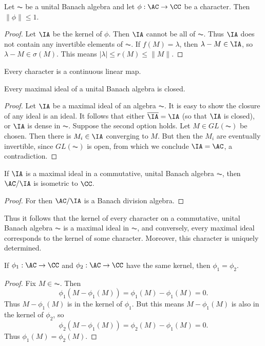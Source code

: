 \begin{lemma}
    Let $\AC$ be a unital Banach algebra and let $\phi: \AC \to \CC$ be a character. Then $\| \phi \| \leq 1$.
\end{lemma}
\begin{proof}
    Let $\IA$ be the kernel of $\phi$. Then $\IA$ cannot be all of $\AC$. Thus $\IA$ does not contain any invertible elements of $\AC$. If $f(M) = \lambda$, then $\lambda - M \in \IA$, so $\lambda - M \in \sigma(M)$. This means $|\lambda| \leq r(M) \leq \| M \|$.
\end{proof}

\begin{corollary}
    Every character is a continuous linear map.
\end{corollary}

\begin{lemma}
    Every maximal ideal of a unital Banach algebra is closed.
\end{lemma}
\begin{proof}
    Let $\IA$ be a maximal ideal of an algebra $\AC$. It is easy to show the closure of any ideal is an ideal. It follows that either $\overline{\IA} = \IA$ (so that $\IA$ is closed), or $\IA$ is dense in $\AC$. Suppose the second option holds. Let $M \in GL(\AC)$ be chosen. Then there is $M_i \in \IA$ converging to $M$. But then the $M_i$ are eventually invertible, since $GL(\AC)$ is open, from which we conclude $\IA = \AC$, a contradiction.
\end{proof}

\begin{corollary}
    If $\IA$ is a maximal ideal in a commutative, unital Banach algebra $\AC$, then $\AC / \IA$ is isometric to $\CC$.
\end{corollary}
\begin{proof}
    For then $\AC / \IA$ is a Banach division algebra.
\end{proof}

Thus it follows that the kernel of every character on a commutative, unital Banach algebra $\AC$ is a maximal ideal in $\AC$, and conversely, every maximal ideal corresponds to the kernel of some character. Moreover, this character is uniquely determined.

\begin{lemma}
    If $\phi_1: \AC \to \CC$ and $\phi_2: \AC \to \CC$ have the same kernel, then $\phi_1 = \phi_2$.
\end{lemma}
\begin{proof}
    Fix $M \in \AC$. Then
    \[ \phi_1(M - \phi_1(M)) = \phi_1(M) - \phi_1(M) = 0. \]
    Thus $M - \phi_1(M)$ is in the kernel of $\phi_1$. But this means $M - \phi_1(M)$ is also in the kernel of $\phi_2$, so
    \[ \phi_2(M - \phi_1(M)) = \phi_2(M) - \phi_1(M) = 0. \]
    Thus $\phi_1(M) = \phi_2(M)$.
\end{proof}

